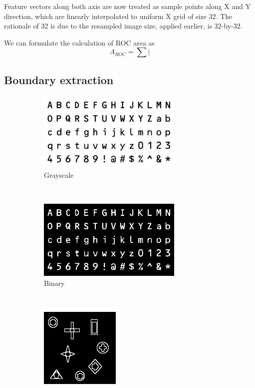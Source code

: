 \documentclass[12pt]{article}
\begin{document}
Feature vectors along both axis are now treated as sample points along X and Y direction, which are linearly interpolated to uniform X grid of size 32. The rationale of 32 is due to the resampled image size, applied earlier, is 32-by-32.

We can formulate the calculation of ROC area as 
\begin{equation}
	A_{ROC} = \sum \vert 
\end{equation}

\newpage
\newpage 

\subsection*{Boundary extraction}
\begin{figure}[H]
    \centering
    \begin{subfigure}[t]{0.6\textwidth}
        \centering
        \includegraphics[height=1.5in]{images/training_original}
        \caption{Grayscale}
    \end{subfigure}%
    ~ 
    \begin{subfigure}[t]{0.24\textwidth}
        \centering
        \includegraphics[height=1.5in]{images/training_binary}
        \caption{Binary}
    \end{subfigure}%
    ~
    \begin{subfigure}[t]{0.24\textwidth}
        \centering
        \includegraphics[height=1.5in]{images/B_m5}

\end{subfigure}
\end{figure}
\end{document}
